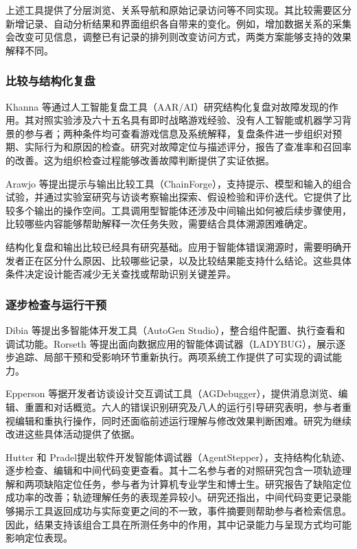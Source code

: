 上述工具提供了分层浏览、关系导航和原始记录访问等不同实现。其比较需要区分新增记录、自动分析结果和界面组织各自带来的变化。例如，增加数据关系的采集会改变可见信息，调整已有记录的排列则改变访问方式，两类方案能够支持的效果解释不同。

\subsubsection{比较与结构化复盘}

Khanna 等\cite{ref04}通过人工智能复盘工具（AAR/AI）研究结构化复盘对故障发现的作用。其对照实验涉及六十五名具有即时战略游戏经验、没有人工智能或机器学习背景的参与者；两种条件均可查看游戏信息及系统解释，复盘条件进一步组织对预期、实际行为和原因的检查。研究对故障定位与描述评分，报告了查准率和召回率的改善。这为组织检查过程能够改善故障判断提供了实证依据。

Arawjo 等\cite{arawjo2024chainforge}提出提示与输出比较工具（ChainForge），支持提示、模型和输入的组合试验，并通过实验室研究与访谈考察输出探索、假设检验和评价迭代。它提供了比较多个输出的操作空间。工具调用型智能体还涉及中间输出如何被后续步骤使用，比较哪些内容能够帮助解释一次任务失败，需要结合具体溯源困难确定。

结构化复盘和输出比较已经具有研究基础。应用于智能体错误溯源时，需要明确开发者正在区分什么原因、比较哪些记录，以及比较结果能支持什么结论。这些具体条件决定设计能否减少无关查找或帮助识别关键差异。

\subsubsection{逐步检查与运行干预}

Dibia 等\cite{ref25}提出多智能体开发工具（AutoGen Studio），整合组件配置、执行查看和调试功能。Rorseth 等\cite{ref28}提出面向数据应用的智能体调试器（LADYBUG），展示逐步追踪、局部干预和受影响环节重新执行。两项系统工作提供了可实现的调试能力。

Epperson 等\cite{ref02}据开发者访谈设计交互调试工具（AGDebugger），提供消息浏览、编辑、重置和对话概览。六人的错误识别研究及八人的运行引导研究表明，参与者重视编辑和重执行操作，同时还面临前述运行理解与修改效果判断困难。研究为继续改进这些具体活动提供了依据。

Hutter 和 Pradel\cite{ref18}提出软件开发智能体调试器（AgentStepper），支持结构化轨迹、逐步检查、编辑和中间代码变更查看。其十二名参与者的对照研究包含一项轨迹理解和两项缺陷定位任务，参与者为计算机专业学生和博士生。研究报告了缺陷定位成功率的改善；轨迹理解任务的表现差异较小。研究还指出，中间代码变更记录能够揭示工具返回成功与实际变更之间的不一致，事件摘要则帮助参与者检索信息。因此，结果支持该组合工具在所测任务中的作用，其中记录能力与呈现方式均可能影响定位表现。

